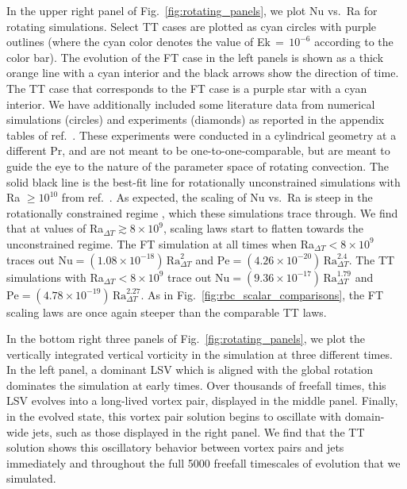 \documentclass[aps, pre, onecolumn, nofootinbib, notitlepage, groupedaddress, amsfonts, amssymb, amsmath, longbibliography, superscriptaddress]{revtex4-1}
\begin{document}
In the upper right panel of Fig.~\ref{fig:rotating_panels}, we plot Nu vs.~Ra for rotating simulations.
Select TT cases are plotted as cyan circles with purple outlines (where the cyan color denotes the value of Ek$\,=\,10^{-6}$ according to the color bar).
The evolution of the FT case in the left panels is shown as a thick orange line with a cyan interior and the black arrows show the direction of time.
The TT case that corresponds to the FT case is a purple star with a cyan interior.
We have additionally included some literature data from numerical simulations (circles) and experiments (diamonds) as reported in the appendix tables of ref.~\cite{cheng&all2015}.
These experiments were conducted in a cylindrical geometry at a different Pr, and are not meant to be one-to-one-comparable, but are meant to guide the eye to the nature of the parameter space of rotating convection.
The solid black line is the best-fit line for rotationally unconstrained simulations with Ra $\geq 10^{10}$ from ref.~\cite{cheng&all2015}.
As expected, the scaling of Nu vs.~Ra is steep in the rotationally constrained regime \cite{julien&all2012, plumley&julien2019}, which these simulations trace through.
We find that at values of Ra$_{\Delta T} \gtrsim 8 \times 10^9$, scaling laws start to flatten towards the unconstrained regime.
The FT simulation at all times when Ra$_{\Delta T} < 8 \times 10^9$ traces out $\text{Nu} = (1.08 \times 10^{-18})\,\text{Ra}_{\Delta T}^{2}$ and $\text{Pe} = (4.26 \times 10^{-20})\,\text{Ra}_{\Delta T}^{2.4}$.
The TT simulations with Ra$_{\Delta T} < 8 \times 10^9$ trace out $\text{Nu} = (9.36 \times 10^{-17})\,\text{Ra}_{\Delta T}^{1.79}$ and $\text{Pe} = (4.78 \times 10^{-19})\,\text{Ra}_{\Delta T}^{2.27}$.
As in Fig.~\ref{fig:rbc_scalar_comparisons}, the FT scaling laws are once again steeper than the comparable TT laws.

In the bottom right three panels of Fig.~\ref{fig:rotating_panels}, we plot the vertically integrated vertical vorticity in the simulation at three different times.
In the left panel, a dominant LSV which is aligned with the global rotation dominates the simulation at early times.
Over thousands of freefall times, this LSV evolves into a long-lived vortex pair, displayed in the middle panel.
Finally, in the evolved state, this vortex pair solution begins to oscillate with domain-wide jets, such as those displayed in the right panel.
We find that the TT solution shows this oscillatory behavior between vortex pairs and jets immediately and throughout the full 5000 freefall timescales of evolution that we simulated.
\end{document}
